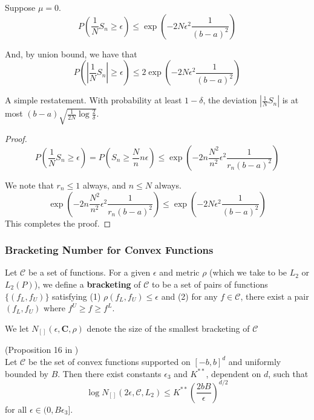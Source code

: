 \begin{corollary}
\label{cor:serfling}
Suppose $\mu = 0$. 
\[
P( \frac{1}{N} S_n \geq \epsilon) \leq \exp( -2 N \epsilon^2 \frac{1}{(b-a)^2})
\]

And, by union bound, we have that
\[
P( | \frac{1}{N} S_n| \geq \epsilon) \leq 2 \exp( -2 N \epsilon^2 \frac{1}{(b-a)^2})
\]

\end{corollary}

A simple restatement. With probability at least $1- \delta$, the deviation $| \frac{1}{N} S_n|$ is at most $ (b-a) \sqrt{ \frac{1}{2N} \log \frac{2}{\delta}}$.

\begin{proof}
\[
P( \frac{1}{N} S_n \geq \epsilon) = P( S_n \geq \frac{N}{n} n \epsilon) \leq \exp( - 2 n \frac{N^2}{n^2} \epsilon^2 \frac{1}{r_n (b-a)^2} ) 
\]

We note that $r_n \leq 1$ always, and $n \leq N$ always. 
\[
\exp( - 2 n \frac{N^2}{n^2} \epsilon^2 \frac{1}{r_n (b-a)^2} )  \leq \exp( - 2 N \epsilon^2 \frac{1}{(b-a)^2})
\]
This completes the proof.

\end{proof}

\subsubsection{Bracketing Number for Convex Functions}

\begin{definition}
Let $\mathcal{C}$ be a set of functions. For a given $\epsilon$ and metric $\rho$ (which we take to be $L_2$ or $L_2(P)$), we define a \textbf{bracketing} of $\mathcal{C}$ to be a set of pairs of functions $\{ (f_L, f_U) \}$ satisfying (1) $\rho( f_L, f_U) \leq \epsilon$ and (2) for any $f \in \mathcal{C}$, there exist a pair $(f_L, f_U)$ where $f^U \geq f \geq f^L$. 

We let $N_{[]}(\epsilon, \mathbf{C}, \rho)$ denote the size of the smallest bracketing of $\mathcal{C}$
\end{definition}

\begin{proposition} (Proposition 16 in \cite{kim2014global})\\
\label{prop:convexbracket}
Let $\mathcal{C}$ be the set of convex functions supported on $[-b, b]^d$ and uniformly bounded by $B$. Then there exist constants $\epsilon_3$ and $K^{**}$, dependent on $d$, such that
\[
\log N_{[]} (2\epsilon, \mathcal{C}, L_2) \leq K^{**} \left( \frac{2bB}{\epsilon} \right)^{d/2}
\]
for all $\epsilon \in (0, B \epsilon_3]$.
\end{proposition}

